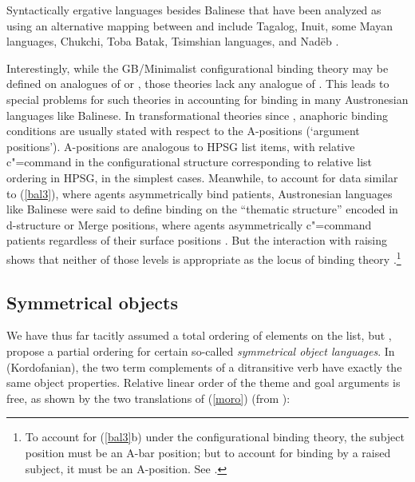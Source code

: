 \documentclass[output=paper
                ,modfonts
                ,nonflat
	        ,collection
	        ,collectionchapter
	        ,collectiontoclongg
 	        ,biblatex
                ,babelshorthands
                ,newtxmath
                ,draftmode
                ,colorlinks, citecolor=brown
]{./langsci/langscibook}
\begin{document}
Syntactically ergative languages besides Balinese that have been analyzed as using an alternative mapping between \argst and \val include Tagalog, Inuit, some Mayan languages, Chukchi, Toba Batak, Tsimshian languages, and Nad{\"e}b \citep{Manning1996,Manning+Sag:1999}.  

Interestingly, while the GB/Minimalist configurational binding theory may be defined on analogues of \val or \content,  those theories lack any analogue of \argst.  This leads to special problems for such theories in accounting for binding in many Austronesian languages like Balinese.  In transformational theories since \citet{Chomsky:1981}, anaphoric binding conditions are usually stated with respect to the A-positions (`argument positions').  A-positions are analogous to HPSG \val list items, with relative c"=command in the configurational structure corresponding to relative list ordering in HPSG, in the simplest cases.  Meanwhile, to account for data similar to (\ref{bal3}), where agents asymmetrically bind patients, Austronesian languages like Balinese were said to define binding on the ``thematic structure'' encoded in d-structure or Merge positions, where agents asymmetrically c"=command patients regardless of their surface positions \citep{Guilfoyle+etal:1992}.  But the interaction with raising shows that neither of those levels is appropriate as the locus of binding theory \citep{Wechsler1999}.\footnote{To account for (\ref{bal3}b) under the configurational binding theory, the subject position must be an A-bar position; but to account for binding by a raised subject, it must be an A-position.  See \citet{Wechsler1999}. } 



\subsection{Symmetrical objects}
We have thus far tacitly assumed a total ordering of elements on the \argst list, but \citet{AMM2013a}, \citet{Ackermanetal2017} propose a partial ordering
 for certain so-called \emph{symmetrical object languages}.  In  (Kordofanian), the two term complements of a ditransitive  verb have exactly the same object properties.  Relative linear order of the theme and goal arguments is free, as shown by the two translations of (\ref{moro}) (from \citealt[9]{Ackermanetal2017}):
\end{document}

